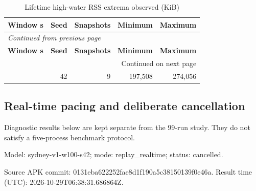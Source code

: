 \documentclass[10pt,a4paper]{article}
\begin{document}
\begingroup\small\setlength{\tabcolsep}{4pt}\renewcommand{\arraystretch}{1.12}
\begin{longtable}{@{}lrrrr@{}}
\caption{Lifetime high-water RSS extrema observed (KiB)}\\
\toprule
\textbf{Window s} & \textbf{Seed} & \textbf{Snapshots} & \textbf{Minimum} & \textbf{Maximum} \\
\midrule\endfirsthead
\multicolumn{5}{l}{\small\itshape Continued from previous page}\\
\toprule
\textbf{Window s} & \textbf{Seed} & \textbf{Snapshots} & \textbf{Minimum} & \textbf{Maximum} \\
\midrule\endhead
\midrule\multicolumn{5}{r}{\small Continued on next page}\\\endfoot
\bottomrule\endlastfoot
100 & 42 & 9 & 197,508 & 274,056 \\
\end{longtable}\endgroup
\subsection{Real-time pacing and deliberate cancellation}
Diagnostic results below are kept separate from the 99-run study. They do not satisfy a five-process benchmark protocol.

Model:\allowbreak{} sydney-v1-w100-s42; mode:\allowbreak{} replay\_\allowbreak{}realtime; status:\allowbreak{} cancelled.

Source APK commit:\allowbreak{} 0131eba622252fae\allowbreak{}8d1f190a5c381501\allowbreak{}39f0e46a. Result time (UTC):\allowbreak{} 2026-10-29T06:\allowbreak{}38:\allowbreak{}31.686864Z.
\end{document}
